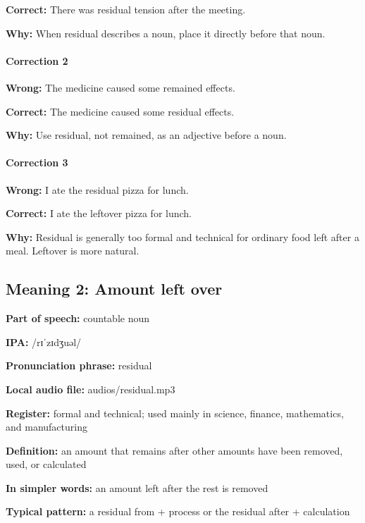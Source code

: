 \documentclass[11pt]{article}
\begin{document}
\textbf{Correct:} There was residual tension after the meeting.

\textbf{Why:} When residual describes a noun, place it directly before that noun.

\paragraph{Correction 2}
\textbf{Wrong:} The medicine caused some remained effects.

\textbf{Correct:} The medicine caused some residual effects.

\textbf{Why:} Use residual, not remained, as an adjective before a noun.

\paragraph{Correction 3}
\textbf{Wrong:} I ate the residual pizza for lunch.

\textbf{Correct:} I ate the leftover pizza for lunch.

\textbf{Why:} Residual is generally too formal and technical for ordinary food left after a meal. Leftover is more natural.

\subsection{Meaning 2: Amount left over}
\textbf{Part of speech:} countable noun

\textbf{IPA:} /rɪˈzɪdʒuəl/

\textbf{Pronunciation phrase:} residual

\textbf{Local audio file:} audios/residual.mp3

\textbf{Register:} formal and technical; used mainly in science, finance, mathematics, and manufacturing

\textbf{Definition:} an amount that remains after other amounts have been removed, used, or calculated

\textbf{In simpler words:} an amount left after the rest is removed

\textbf{Typical pattern:} a residual from + process or the residual after + calculation
\end{document}
